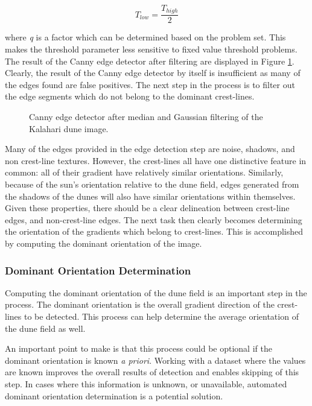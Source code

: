 \begin{equation}
T_{low}=\frac{T_{high}}{2}
\end{equation}

where \emph{q} is a factor which can be determined based on the problem set. This makes the threshold parameter less sensitive to fixed value threshold problems. The result of the Canny edge detector after filtering are displayed in Figure \ref{fig:canny_edges}. Clearly, the result of the Canny edge detector by itself is insufficient as many of the edges found are false positives. The next step in the process is to filter out the edge segments which do not belong to the dominant crest-lines.

 \begin{figure}
 	\centering
 	\caption{Canny edge detector after median and Gaussian filtering of the Kalahari dune image.}
 	\label{fig:canny_edges}
 \end{figure}
 
 Many of the edges provided in the edge detection step are noise, shadows, and non crest-line textures. However, the crest-lines all have one distinctive feature in common: all of their gradient have relatively similar orientations. Similarly, because of the sun's orientation relative to the dune field, edges generated from the shadows of the dunes will also have similar orientations within themselves. Given these properties, there should be a clear delineation between crest-line edges, and non-crest-line edges. The next task then clearly becomes determining the orientation of the gradients which belong to crest-lines. This is accomplished by computing the dominant orientation of the image.
 
 \subsubsection*{Dominant Orientation Determination} \label{subsec:dominant_orientation}
 
 Computing the dominant orientation of the dune field is an important step in the process. The dominant orientation is the overall gradient direction of the crest-lines to be detected. This process can help determine the average orientation of the dune field as well. 
 
 An important point to make is that this process could be optional if the dominant orientation is known \emph{a priori}. Working with a dataset where the values are known improves the overall results of detection and enables skipping of this step. In cases where this information is unknown, or unavailable, automated dominant orientation determination is a potential solution.
 
